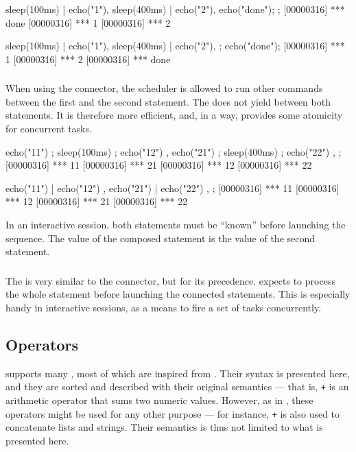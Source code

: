 \begin{urbiscript}
{
  sleep(100ms) | echo("1"),
  sleep(400ms) | echo("2"),
  echo("done");
};
[00000316] *** done
[00000316] *** 1
[00000316] *** 2
\end{urbiscript}

\begin{urbiscript}
{
  sleep(100ms) | echo("1"),
  sleep(400ms) | echo("2"),
};
echo("done");
[00000316] *** 1
[00000316] *** 2
[00000316] *** done
\end{urbiscript}


\subsubsection{\samp{|}}
When using the \samp{;} connector, the scheduler is allowed to run
other commands between the first and the second statement.  The
\samp{|} does not yield between both statements.  It is therefore more
efficient, and, in a way, provides some atomicity for concurrent tasks.

\begin{urbiscript}
{
  { echo("11") ; sleep(100ms) ; echo("12") },
  { echo("21") ; sleep(400ms) ; echo("22") },
};
[00000316] *** 11
[00000316] *** 21
[00000316] *** 12
[00000316] *** 22
\end{urbiscript}

\begin{urbiscript}
{
  { echo("11") | echo("12") },
  { echo("21") | echo("22") },
};
[00000316] *** 11
[00000316] *** 12
[00000316] *** 21
[00000316] *** 22
\end{urbiscript}

In an interactive session, both statements must be ``known'' before
launching the sequence.  The value of the composed statement is the value of
the second statement.

\subsubsection{\samp{\&}}

The \samp{\&} is very similar to the \samp{,} connector, but for its
precedence.  \urbi expects to process the whole statement before launching
the connected statements.  This is especially handy in interactive sessions,
as a means to fire a set of tasks concurrently.


\subsection{Operators}
\label{sec:lang:op}
\us supports many , most of which are inspired from
\Cxx. Their syntax is presented here, and they are sorted and described with
their original semantics --- that is, \lstinline|+| is an arithmetic
operator that sums two numeric values. However, as in \Cxx, these operators
might be used for any other purpose --- for instance, \lstinline|+| is also
used to concatenate lists and strings.  Their semantics is thus not limited
to what is presented here.

